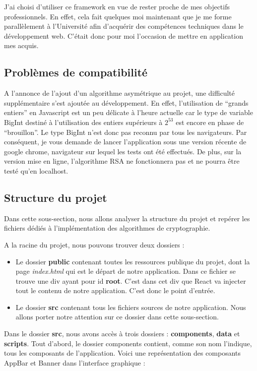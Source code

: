 \documentclass{article}
\begin{document}
J'ai choisi d'utiliser ce framework en vue de rester proche de mes objectifs professionnels. En effet, cela fait quelques moi maintenant que je me forme parallèlement à l'Université afin d'acquérir des compétences techniques dans le développement web. C'était donc pour moi l'occasion de mettre en application mes acquis.

\cleardoublepage

\subsection{Problèmes de compatibilité}
A l'annonce de l'ajout d'un algorithme asymétrique au projet, une difficulté supplémentaire s'est ajoutée au développement. En effet, l'utilisation de \foreignquote{french}{grands entiers} en Javascript est un peu délicate à l'heure actuelle car le type de variable BigInt destiné à l'utilisation des entiers supérieurs à $2^{53}$ est encore en phase de \foreignquote{french}{brouillon}\cite{bigInt}. Le type BigInt n'est donc pas reconnu par tous les navigateurs. Par conséquent, je vous demande de lancer l'application sous une version récente de google chrome, navigateur sur lequel les tests ont été effectués. De plus, sur la version mise en ligne, l'algorithme RSA ne fonctionnera pas et ne pourra être testé qu'en localhost. 

\subsection{Structure du projet}
Dans cette sous-section, nous allons analyser la structure du projet et repérer les fichiers dédiés à l'implémentation des algorithmes de cryptographie.

A la racine du projet, nous pouvons trouver deux dossiers : 
\begin{itemize}
\item Le dossier \textbf{public} contenant toutes les ressources publique du projet, dont la page\textit{ index.html} qui est le départ de notre application. Dans ce fichier se trouve une div ayant pour id \textbf{root}. C'est dans cet div que React va injecter tout le contenu de notre application. C'est donc le point d'entrée.
\item Le dossier \textbf{src} contenant tous les fichiers sources de notre application. Nous allons porter notre attention sur ce dossier dans cette sous-section.
\end{itemize}

Dans le dossier \textbf{src}, nous avons accès à trois dossiers : \textbf{components}, \textbf{data} et \textbf{scripts}. 
Tout d'abord, le dossier components contient, comme son nom l'indique, tous les composants de l'application. Voici une représentation des composants AppBar et Banner dans l'interface graphique :
\end{document}
